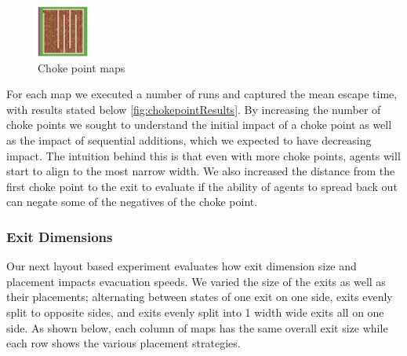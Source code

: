 \documentclass[12pt,letterpaper]{article}
\begin{document}
\begin{figure}[!ht]
\begin{minipage}[b]{\linewidth}
    \includegraphics[width=0.15\textwidth]{./figures/chokepoint_3_d.png}
  \end{minipage}
  \caption{Choke point maps}
  \label{chokepointmaps}
\end{figure}

For each map we executed a number of runs and captured the mean escape time, with results stated below \ref{fig:chokepointResults}.  By increasing the number of choke points we sought to understand the initial impact of a choke point as well as the impact of sequential additions, which we expected to have decreasing impact. The intuition behind this is that even with more choke points, agents will start to align to the most narrow width.  We also increased the distance from the first choke point to the exit to evaluate if the ability of agents to spread back out can negate some of the negatives of the choke point.  

\subsubsection{Exit Dimensions} \label{exitdims}

Our next layout based experiment evaluates how exit dimension size and placement impacts evacuation speeds.  We varied the size of the exits as well as their placements; alternating between states of one exit on one side, exits evenly split to opposite sides, and exits evenly split into 1 width wide exits all on one side.  As shown below, each column of maps has the same overall exit size while each row shows the various placement strategies.
\end{document}
